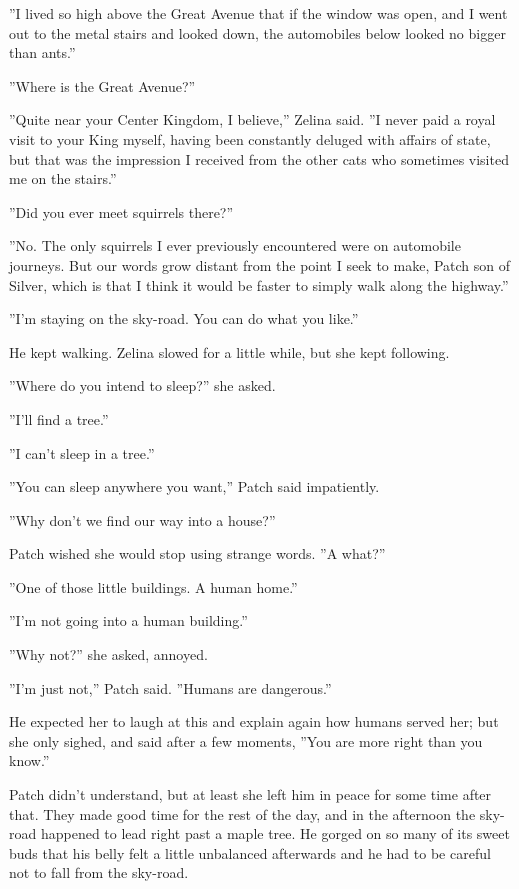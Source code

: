 \documentclass[12pt]{book}
\begin{document}
''I lived so high above the Great Avenue that if the window was open, and I went out to the metal stairs and looked down, the automobiles below looked no bigger than ants.''

''Where is the Great Avenue?''

''Quite near your Center Kingdom, I believe,'' Zelina said. ''I never paid a royal visit to your King myself, having been constantly deluged with affairs of state, but that was the impression I received from the other cats who sometimes visited me on the stairs.''

''Did you ever meet squirrels there?''

''No. The only squirrels I ever previously encountered were on automobile journeys. But our words grow distant from the point I seek to make, Patch son of Silver, which is that I think it would be faster to simply walk along the highway.''

''I'm staying on the sky-road. You can do what you like.''

He kept walking. Zelina slowed for a little while, but she kept following.

''Where do you intend to sleep?'' she asked.

''I'll find a tree.''

''I can't sleep in a tree.''

''You can sleep anywhere you want,'' Patch said impatiently.

''Why don't we find our way into a house?''

Patch wished she would stop using strange words. ''A what?''

''One of those little buildings. A human home.''

''I'm not going into a human building.''

''Why not?'' she asked, annoyed.

''I'm just not,'' Patch said. ''Humans are dangerous.''

He expected her to laugh at this and explain again how humans served her; but she only sighed, and said after a few moments, ''You are more right than you know.''

Patch didn't understand, but at least she left him in peace for some time after that. They made good time for the rest of the day, and in the afternoon the sky-road happened to lead right past a maple tree. He gorged on so many of its sweet buds that his belly felt a little unbalanced afterwards and he had to be careful not to fall from the sky-road.
\end{document}
